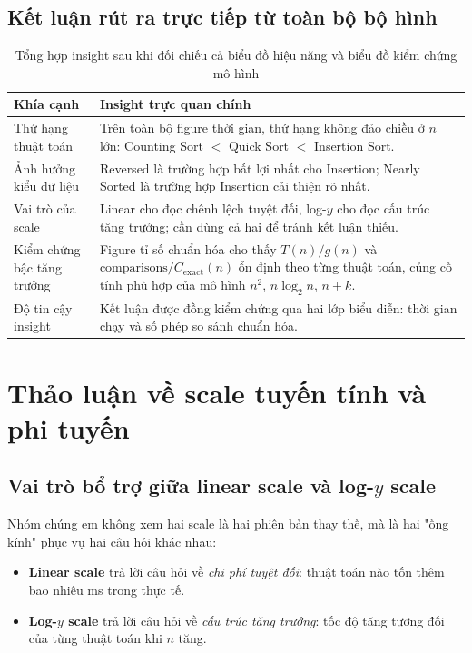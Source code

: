 \subsection{Kết luận rút ra trực tiếp từ toàn bộ bộ hình}

\begin{table}[H]
\centering
\renewcommand{\arraystretch}{1.25}
\begin{tabular}{p{3.8cm}p{9.2cm}}
\toprule
\textbf{Khía cạnh} & \textbf{Insight trực quan chính} \\
\midrule
Thứ hạng thuật toán & Trên toàn bộ figure thời gian, thứ hạng không đảo chiều ở $n$ lớn: Counting Sort $<$ Quick Sort $<$ Insertion Sort. \\
Ảnh hưởng kiểu dữ liệu & Reversed là trường hợp bất lợi nhất cho Insertion; Nearly Sorted là trường hợp Insertion cải thiện rõ nhất. \\
Vai trò của scale & Linear cho đọc chênh lệch tuyệt đối, log-$y$ cho đọc cấu trúc tăng trưởng; cần dùng cả hai để tránh kết luận thiếu. \\
Kiểm chứng bậc tăng trưởng & Figure tỉ số chuẩn hóa cho thấy $T(n)/g(n)$ và $\text{comparisons}/C_{\text{exact}}(n)$ ổn định theo từng thuật toán, củng cố tính phù hợp của mô hình $n^2$, $n\log_2 n$, $n+k$. \\
Độ tin cậy insight & Kết luận được đồng kiểm chứng qua hai lớp biểu diễn: thời gian chạy và số phép so sánh chuẩn hóa. \\
\bottomrule
\end{tabular}
\caption{Tổng hợp insight sau khi đối chiếu cả biểu đồ hiệu năng và biểu đồ kiểm chứng mô hình}
\label{tab:top-insights}
\end{table}



\section{Thảo luận về scale tuyến tính và phi tuyến}

\subsection{Vai trò bổ trợ giữa linear scale và log-$y$ scale}

Nhóm chúng em không xem hai scale là hai phiên bản thay thế, mà là hai "ống kính" phục vụ hai câu hỏi khác nhau:
\begin{itemize}[leftmargin=1.2cm]
    \item \textbf{Linear scale} trả lời câu hỏi về \textit{chi phí tuyệt đối}: thuật toán nào tốn thêm bao nhiêu ms trong thực tế.
    \item \textbf{Log-$y$ scale} trả lời câu hỏi về \textit{cấu trúc tăng trưởng}: tốc độ tăng tương đối của từng thuật toán khi $n$ tăng.
\end{itemize}

